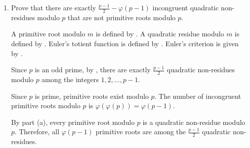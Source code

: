 \begin{enumerate}
\begin{enumerate}
\begin{subprove}
      Let $r$ be a primitive root modulo $p$. Then, by , $\operatorname{ord}_p(r) = \varphi(p) = p-1$.
      
      It is shown that $r$ is a quadratic non-residue modulo $p$ by contradiction.
      Suppose, for the sake of contradiction, that $r$ is a quadratic residue modulo $p$.
      Then, by , there exists $x \in \setZ$ such that $x^2 \equiv r \pmod{p}$.
      Since $r$ is a primitive root, it follows that $\gcd(r, p) = 1$, so $\gcd(x, p) = 1$ as well.
      Therefore,
      \[
      r^{(p-1)/2} \equiv (x^2)^{(p-1)/2} = x^{p-1} \equiv 1 \pmod{p}
      \]
      by .
      However, since $\operatorname{ord}_p(r) = p-1$ and $(p-1)/2 < p-1$, it follows that $r^{(p-1)/2} \not\equiv 1 \pmod{p}$.
      This is a contradiction.
      Therefore, $r$ is not a quadratic residue modulo $p$, so $r$ is a quadratic non-residue modulo $p$.
      
      Since $r$ is a quadratic non-residue modulo $p$, by , it follows that $\left(\frac{r}{p}\right) = -1$.
      By  (Euler's criterion), it follows that
      \[
      r^{(p-1)/2} \equiv \left(\frac{r}{p}\right) = -1 \pmod{p}.
      \]
      Therefore, $r^{(p-1)/2} \equiv -1 \pmod{p}$.
    \end{subprove}
    
    \item Prove that there are exactly $\frac{p-1}{2}-\varphi(p-1)$ incongruent quadratic non-residues 
    modulo $p$ that are not primitive roots modulo $p$.
    \begin{subprove}
      A primitive root modulo $m$ is defined by .
      A quadratic residue modulo $m$ is defined by .
      Euler's totient function is defined by .
      Euler's criterion is given by .
      
      Since $p$ is an odd prime, by , there are exactly $\frac{p-1}{2}$ quadratic non-residues modulo $p$ among the integers $1, 2, \ldots, p-1$.
      
      Since $p$ is prime, primitive roots exist modulo $p$. The number of incongruent primitive roots modulo $p$ is $\varphi(\varphi(p)) = \varphi(p-1)$.
      
      By part (a), every primitive root modulo $p$ is a quadratic non-residue modulo $p$.
      Therefore, all $\varphi(p-1)$ primitive roots are among the $\frac{p-1}{2}$ quadratic non-residues.
      

\end{subprove}
\end{enumerate}
\end{enumerate}
